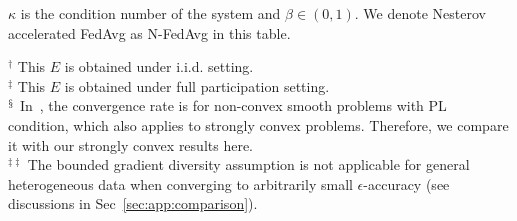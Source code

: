 \begin{table}[h!]
{$\kappa$ is the condition number of the system and $\beta \in (0,1)$. We denote Nesterov accelerated FedAvg as N-FedAvg in this table.}
{\raggedright 
         $^{\dagger}$ This $E$ is obtained under i.i.d. setting. \\
         $^{\ddagger}$ This $E$ is obtained under full participation setting. \\ 
         $^{\mathsection}$ In~\cite{haddadpour2019convergence}, the convergence rate is for non-convex smooth problems with PL condition, which also applies to strongly convex problems. Therefore, we compare it with our strongly convex results here.\\
         $^{\ddagger\ddagger}$ The bounded gradient diversity assumption is not applicable for general heterogeneous data when converging to arbitrarily small $\epsilon$-accuracy (see discussions in Sec~\ref{sec:app:comparison}).
           \par}
\label{tb:convergenceratev3}
\end{table}



